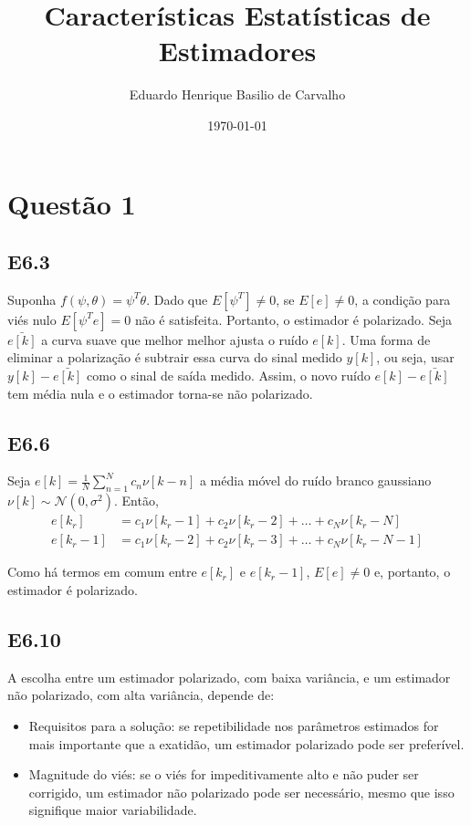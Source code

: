 \documentclass{article}
\title{Características Estatísticas de Estimadores}
\author{Eduardo Henrique Basilio de Carvalho}
\date{\today}
\begin{document}
\maketitle

\section*{Questão 1}

\subsection*{E6.3}

Suponha $f(\psi, \theta) = \psi^T\theta$. Dado que $E[\psi^T] \ne 0$, se $E[e] \ne 0$, a condição para viés nulo $E[\psi^Te] = 0$ não é satisfeita. Portanto, o estimador é polarizado.
Seja $\bar{e[k]}$ a curva suave que melhor melhor ajusta o ruído $e[k]$. Uma forma de eliminar a polarização é subtrair essa curva do sinal medido $y[k]$, ou seja, usar $y[k] - \bar{e[k]}$ como o sinal de saída medido. Assim, o novo ruído $e[k] - \bar{e[k]}$ tem média nula e o estimador torna-se não polarizado.

\subsection*{E6.6}

Seja $e[k] = \frac{1}{N}\sum_{n=1}^{N}c_n\nu[k - n]$ a média móvel do ruído branco gaussiano $\nu[k] \sim \mathcal{N}(0, \sigma^2)$. Então,
\begin{align*}
    e[k_r] &= c_1\nu[k_r - 1] + c_2\nu[k_r - 2] + \ldots + c_N\nu[k_r - N] \\
    e[k_r - 1] &= c_1\nu[k_r - 2] + c_2\nu[k_r - 3] + \ldots + c_N\nu[k_r - N - 1]
\end{align*}

Como há termos em comum entre $e[k_r]$ e $e[k_r - 1]$, $E[e] \ne 0$ e, portanto, o estimador é polarizado.

\subsection*{E6.10}

A escolha entre um estimador polarizado, com baixa variância, e um estimador não polarizado, com alta variância, depende de:

\begin{itemize}
    \item Requisitos para a solução: se repetibilidade nos parâmetros estimados for mais importante que a exatidão, um estimador polarizado pode ser preferível.
    \item Magnitude do viés: se o viés for impeditivamente alto e não puder ser corrigido, um estimador não polarizado pode ser necessário, mesmo que isso signifique maior variabilidade.
\end{itemize}
\end{document}
